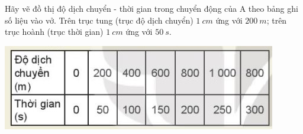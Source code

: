 \begin{ex}
	Hãy vẽ đồ thị độ dịch chuyển - thời gian trong chuyển động của A theo bảng ghi số liệu vào vở. Trên trục tung (trục độ dịch chuyển) $\SI{1}{cm}$ ứng với $\SI{200}{m}$; trên trục hoành (trục thời gian) $\SI{1}{cm}$ ứng với $\SI{50}{s}$.
	\begin{center}
		\includegraphics[scale=1]{figs/G10Y25B3-33}
	\end{center}
\end{ex}

